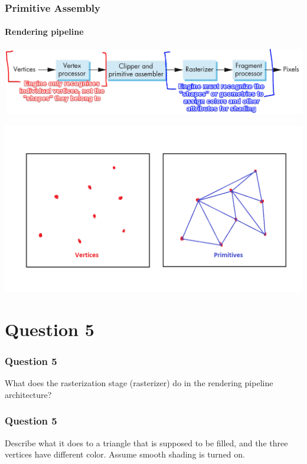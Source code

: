 \documentclass{beamer}
\begin{document}
\begin{frame}
    \frametitle{Primitive Assembly}
    \framesubtitle{Rendering pipeline}
    
    {\centering \includegraphics[scale=0.4]{simple-pipeline-annot.png}}

    {\begin{center} \includegraphics[scale=0.28]{q4-vert-prim.png} \end{center}}

\end{frame}

\section{Question 5}

\begin{frame}
    \frametitle{Question 5}
    What does the rasterization stage (rasterizer) do in the rendering pipeline architecture?
\end{frame}

\begin{frame}
    \frametitle{Question 5}
    Describe what it does to a triangle that is supposed to be filled, and the three vertices have
    different color. Assume smooth shading is turned on.
\end{frame}
\end{document}
